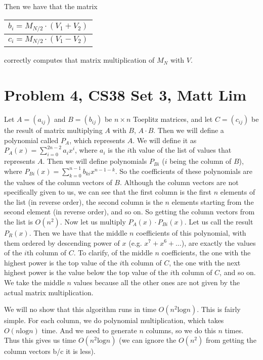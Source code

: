 \documentclass{article}
\begin{document}
Then we have that the matrix
\begin{center}
  \begin{tabular}{ | l | }
    \hline
    $b_i = M_{N/2} \cdot (V_1 + V_2)$  \\ \hline
    $c_i = M_{N/2} \cdot (V_1 - V_2)$ \\ \hline
  \end{tabular}
\end{center}
correctly computes that matrix multiplication of $M_N$ with $V$.
\newpage

\section*{Problem 4, CS38 Set 3, Matt Lim}
Let $A = (a_{ij})$ and $B = (b_{ij})$ be $n \times n$ Toeplitz matrices, and
let $C = (c_{ij})$ be the result of
matrix multiplying $A$ with $B$, $A \cdot B$.
Then we will
define a polynomial called $P_A$, which represents $A$. We will define it as
$P_A(x) = \sum_{i=0}^{2n-2} a_ix^i$, where $a_i$ is the $i$th value of the list
of values that represents $A$. Then we will define polynomials $P_{Bi}$ ($i$
being the column of $B$), where
$P_{Bi}(x) = \sum_{k=0}^{n-1} b_{ki}x^{n-1-k}$. So the coefficients of these
polynomials are the values of the column vectors of $B$. Although the column vectors are not
specifically given to us, we can see that the first column is the first $n$
elements of the list (in reverse order), the second column is the $n$ elements
starting from the second
element (in reverse order), and so on. So getting the column vectors from the
list is $O(n^2)$.
Now let us multiply $P_A(x) \cdot P_{Bi}(x)$. Let us call the result $P_R(x)$.
Then we have that the middle $n$ coefficients of this polynomial, with them
ordered by descending power of $x$ (e.g. $x^7 + x^6 + \dots$), are exactly the
values of the $i$th column of $C$. To clarify, of the middle $n$ coefficients,
the one with the highest power is the top value of the $i$th column of $C$, the
one with the next highest power is the value below the top value of the $i$th
column of $C$, and so on. We take the middle $n$ values because all the other
ones are not given by the actual matrix multiplication.

We will no show that this algorithm runs in time $O(n^2\text{log}n)$. This is
fairly simple. For each column, we do polynomial multiplication, which takes
$O(n\text{log}n)$ time. And we need to generate $n$ columns, so we do this $n$
times. Thus this gives us time $O(n^2\text{log}n)$ (we can ignore the $O(n^2)$
from getting the column vectors b/c it is less).
\newpage
\end{document}
